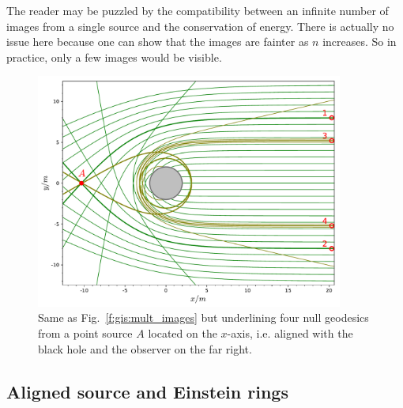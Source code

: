 \begin{remark}
The reader may be puzzled by the compatibility between an infinite number
of images from a single source and the conservation of energy. There is
actually no issue here because one can show that the images are
fainter as $n$ increases. So in practice, only a few images would be visible.
\end{remark}

\begin{figure}
\centerline{\includegraphics[width=0.9\textwidth]{ges_images_aligned.pdf}}
\caption[]{\label{f:gis:images_aligned} \footnotesize
Same as Fig.~\ref{f:gis:mult_images} but underlining four null geodesics
from a point source $A$ located on the $x$-axis, i.e.
aligned with the black hole and the observer on the far right.}
\end{figure}


\subsection{Aligned source and Einstein rings}

